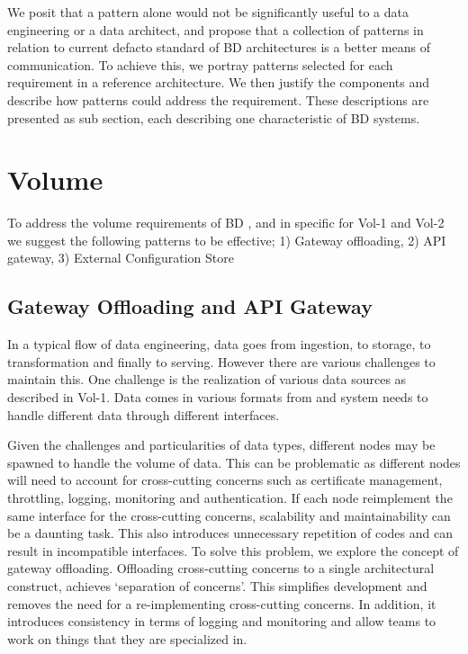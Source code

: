 \documentclass[a4paper,11pt,article,oneside]{memoir}
\begin{document}
We posit that a pattern alone would not be significantly useful to a data engineering or a data architect, and propose that a collection of patterns in relation to current defacto standard of BD architectures is a better means of communication. To achieve this, we portray patterns selected for each requirement in a reference architecture. We then justify the components and describe how patterns could address the requirement. These descriptions are presented as sub section, each describing one characteristic of BD systems. 


\section{Volume} \label{volumeSection}


To address the volume requirements of BD , and in specific for Vol-1 and Vol-2 we suggest the following patterns to be effective; 1) Gateway offloading, 2) API gateway, 3) External Configuration Store

\subsection{Gateway Offloading and API Gateway}

In a typical flow of data engineering, data goes from ingestion, to storage, to transformation and finally to serving. However there are various challenges to maintain this. One challenge is the realization of various data sources as described in Vol-1. Data comes in various formats from and system needs to handle different data through different interfaces. 


Given the challenges and particularities of data types, different nodes may be spawned to handle the volume of data. This can be problematic as different nodes will need to account for cross-cutting concerns such as certificate management, throttling, logging, monitoring and authentication. If each node reimplement the same interface for the cross-cutting concerns, scalability and maintainability can be a daunting task. This also introduces unnecessary repetition of codes and can result in incompatible interfaces. To solve this problem, we explore the concept of gateway offloading. Offloading cross-cutting concerns to a single architectural construct, achieves `separation of concerns'. This simplifies development and removes the need for a re-implementing cross-cutting concerns. In addition, it introduces consistency in terms of logging and monitoring and allow teams to work on things that they are specialized in.
\end{document}
